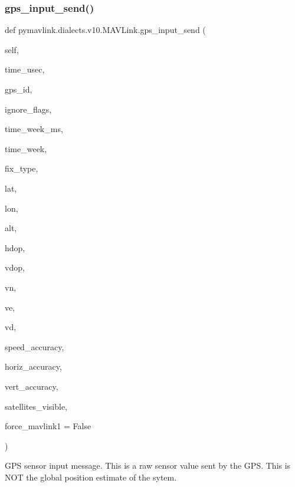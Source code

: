 \begin{DoxyVerb}
\begin{DoxyVerb}
\subsubsection{\texorpdfstring{gps\+\_\+input\+\_\+send()}{gps\_input\_send()}}
{\footnotesize\ttfamily def pymavlink.\+dialects.\+v10.\+M\+A\+V\+Link.\+gps\+\_\+input\+\_\+send (\begin{DoxyParamCaption}\item[{}]{self,  }\item[{}]{time\+\_\+usec,  }\item[{}]{gps\+\_\+id,  }\item[{}]{ignore\+\_\+flags,  }\item[{}]{time\+\_\+week\+\_\+ms,  }\item[{}]{time\+\_\+week,  }\item[{}]{fix\+\_\+type,  }\item[{}]{lat,  }\item[{}]{lon,  }\item[{}]{alt,  }\item[{}]{hdop,  }\item[{}]{vdop,  }\item[{}]{vn,  }\item[{}]{ve,  }\item[{}]{vd,  }\item[{}]{speed\+\_\+accuracy,  }\item[{}]{horiz\+\_\+accuracy,  }\item[{}]{vert\+\_\+accuracy,  }\item[{}]{satellites\+\_\+visible,  }\item[{}]{force\+\_\+mavlink1 = {\ttfamily False} }\end{DoxyParamCaption})}

\begin{DoxyVerb}GPS sensor input message.  This is a raw sensor value sent by the GPS.
This is NOT the global position estimate of the sytem.


\end{DoxyVerb}
\end{DoxyVerb}
\end{DoxyVerb}
